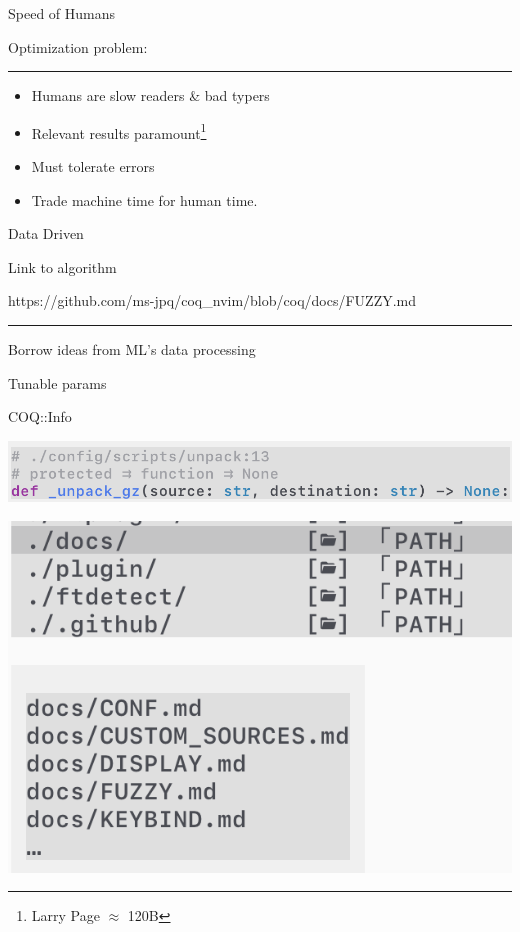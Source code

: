 \documentclass{beamer}
\begin{document}
\begin{frame}{Speed of Humans}

	Optimization problem:

	\rule{\textwidth}{0.1em}

	\begin{itemize}

		\item Humans are slow readers \& bad typers

		\item Relevant results paramount\footnote{Larry Page $\approx$ 120B}

		\item Must tolerate errors

		\item Trade machine time for human time.

	\end{itemize}

\end{frame}


\begin{frame}{Data Driven}

	Link to algorithm

	https://github.com/ms-jpq/coq\_nvim/blob/coq/docs/FUZZY.md

	\rule{\textwidth}{0.1em}

	Borrow ideas from ML's data processing

	Tunable params

\end{frame}


\begin{frame}{COQ::Info}

	\includegraphics[width=\textwidth]{info_ctags}

	\includegraphics[width=\textwidth]{info_paths}

\end{frame}
\end{document}
